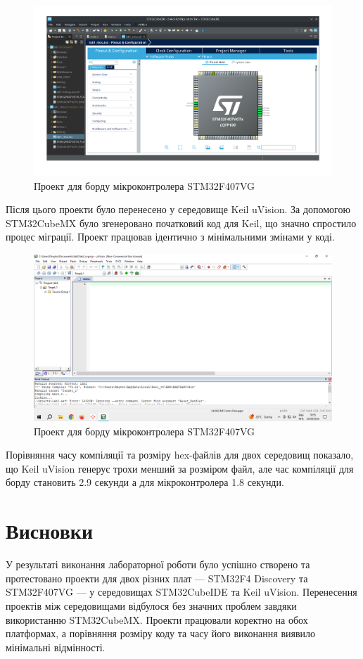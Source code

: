 \documentclass[oneside,14pt]{extarticle}
\begin{document}
\begin{normalsize}
	\begin{figure}[H]
		\centering
		\includegraphics[scale=0.4]{2}
		\caption{Проект для борду мікроконтролера STM32F407VG}
	\end{figure}
	
	Після цього проекти було перенесено у середовище Keil uVision. За допомогою STM32CubeMX було згенеровано початковий код для Keil, що значно спростило процес міграції. Проект працював ідентично з мінімальними змінами у коді.
	
	\begin{figure}[H]
		\centering
		\includegraphics[scale=0.4]{3}
		\caption{Проект для борду мікроконтролера STM32F407VG}
	\end{figure}
	
	Порівняння часу компіляції та розміру hex-файлів для двох середовищ показало, що Keil uVision генерує трохи менший за розміром файл, але час компіляції для борду становить 2.9 секунди а для мікроконтролера 1.8 секунди. 
	
	\section*{\hfil Висновки\hfil}
	У результаті виконання лабораторної роботи було успішно створено та протестовано проекти для двох різних плат — STM32F4 Discovery та STM32F407VG — у середовищах STM32CubeIDE та Keil uVision. Перенесення проектів між середовищами відбулося без значних проблем завдяки використанню STM32CubeMX. Проекти працювали коректно на обох платформах, а порівняння розміру коду та часу його виконання виявило мінімальні відмінності.
		    
\end{normalsize}
\end{document}
